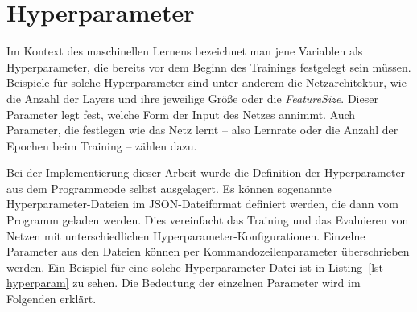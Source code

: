   

\section{Hyperparameter}


Im Kontext des maschinellen Lernens bezeichnet man jene Variablen als Hyperparameter, 
die bereits vor dem Beginn des Trainings festgelegt sein müssen.
Beispiele für solche Hyperparameter sind unter anderem die Netzarchitektur, wie die Anzahl der Layers und ihre jeweilige Größe 
oder die \textit{FeatureSize}.
Dieser Parameter legt fest, welche Form der Input des Netzes annimmt.
Auch Parameter, die festlegen wie das Netz lernt -- also Lernrate oder die Anzahl der Epochen beim Training -- zählen dazu.

Bei der Implementierung dieser Arbeit wurde die Definition der Hyperparameter aus dem Programmcode selbst ausgelagert.
Es können sogenannte Hyperparameter-Dateien im JSON-Dateiformat definiert werden, die dann vom Programm geladen werden.
Dies vereinfacht das Training und das Evaluieren von Netzen mit unterschiedlichen Hyperparameter-Konfigurationen.
Einzelne Parameter aus den Dateien können per Kommandozeilenparameter überschrieben werden.
Ein Beispiel für eine solche Hyperparameter-Datei ist in Listing~\ref{lst-hyperparam} zu sehen.
Die Bedeutung der einzelnen Parameter wird im Folgenden erklärt.


\newpage

